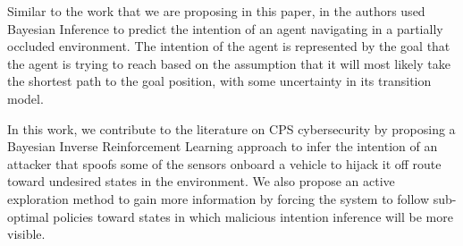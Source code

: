 \documentclass[letterpaper, 10 pt, conference]{ieeeconf}  %
\begin{document}

Similar to the work that we are proposing in this paper, in \cite{best2015bayesian} the authors used Bayesian Inference to predict the intention of an agent navigating in a partially occluded environment. The intention of the agent is represented by the goal that the agent is trying to reach based on the assumption that it will most likely take the shortest path to the goal position, with some uncertainty in its transition model.

In this work, we contribute to the literature on CPS cybersecurity by proposing a Bayesian Inverse Reinforcement Learning approach to infer the intention of an attacker that spoofs some of the sensors onboard a vehicle to hijack it off route toward undesired states in the environment. We also propose an active exploration method to gain more information by forcing the system to follow sub-optimal policies toward states in which malicious intention inference will be more visible.
%
\end{document}
